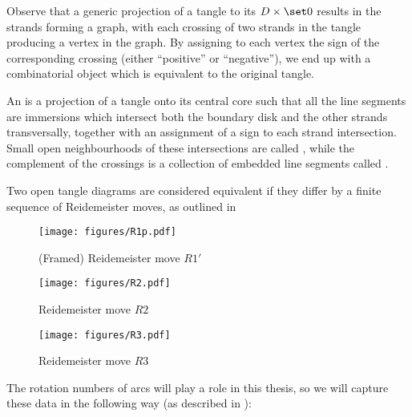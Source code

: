 Observe that a generic projection of a tangle to its 
$D\times \set 0$ results in the strands forming a graph, with each crossing of
two strands in the tangle producing a vertex in the graph. By assigning to each
vertex the sign of the corresponding crossing (either \enquote{positive} or
\enquote{negative}), we end up with a combinatorial object which is equivalent
to the original tangle.

\begin{definition}\label{def:open_tangle_diagram}
        An  is a projection of a tangle onto its
        central core such that all the line segments are immersions which
        intersect both the boundary disk and the other strands transversally,
        together with an assignment of a sign to each strand intersection.
        Small open neighbourhoods of these intersections are called
        , while the complement of the crossings is a collection
        of embedded line segments called .

        Two open tangle diagrams are considered equivalent if they differ by a
        finite sequence of Reidemeister moves, as outlined in
\end{definition}

\begin{figure}[h]
        \centering
        \texttt{[image: figures/R1p.pdf]}
        \caption{(Framed) Reidemeister move $R1'$}
        \label{fig:R1p}
\end{figure}
\begin{figure}[h]
        \centering
        \texttt{[image: figures/R2.pdf]}
        \caption{Reidemeister move $R2$}
        \label{fig:R2}
\end{figure}
\begin{figure}[h]
        \centering
        \texttt{[image: figures/R3.pdf]}
        \caption{Reidemeister move $R3$}
        \label{fig:R3}
\end{figure}

The rotation numbers of arcs will play a role in this thesis, so we will capture
these data in the following way (as described in \cite{BV23}):

